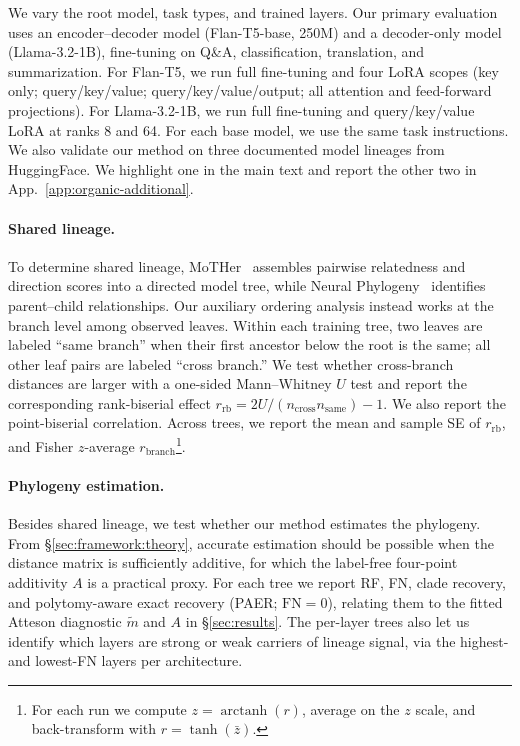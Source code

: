 \documentclass{article}
\theoremstyle{definition}
\theoremstyle{plain}
\begin{document}
We vary the root model, task types, and trained layers. Our primary evaluation uses an
encoder--decoder model (Flan-T5-base, 250M) and a decoder-only model (Llama-3.2-1B), fine-tuning on
Q\&A, classification, translation, and summarization. For Flan-T5, we run full fine-tuning and four LoRA \citep{hu2022lora}
scopes (key only; query/key/value; query/key/value/output; all attention and feed-forward projections).
For Llama-3.2-1B, we run full fine-tuning and query/key/value LoRA at ranks 8 and 64. For each base
model, we use the same task instructions. We also
validate our method on three documented model lineages from HuggingFace. We highlight one in the
main text and report the other two in App.~\ref{app:organic-additional}.

\paragraph{Shared lineage.}
To determine shared lineage, MoTHer~\citep{horwitz2025mother} assembles pairwise relatedness and direction scores into a directed
model tree, while Neural Phylogeny~\citep{yu2025neural} identifies parent--child relationships. Our
auxiliary ordering analysis instead works at the branch level among observed leaves. Within each
training tree, two leaves are labeled ``same branch'' when their first ancestor below the root is
the same; all other leaf pairs are labeled ``cross branch.'' We test whether cross-branch distances
are larger with a one-sided Mann--Whitney $U$ test and report the corresponding rank-biserial effect
$r_{\mathrm{rb}}=2U/(n_{\mathrm{cross}}n_{\mathrm{same}})-1$. We also report the point-biserial correlation. Across trees, we report the mean and
sample SE of $r_{\mathrm{rb}}$, and Fisher $z$-average $r_{\mathrm{branch}}$\footnote{For each run we
compute $z=\operatorname{arctanh}(r)$, average on the $z$ scale, and back-transform with
$r=\tanh(\bar z)$.}.

\paragraph{Phylogeny estimation.}
\label{sec:exp:weights}
Besides shared lineage, we test whether our method estimates the phylogeny. From \S\ref{sec:framework:theory}, accurate estimation should be possible when the distance matrix is sufficiently additive, for which the label-free four-point additivity $A$ is a practical proxy. For each tree we report RF, FN, clade recovery, and polytomy-aware exact recovery (PAER; $\mathrm{FN}=0$), relating them to the fitted Atteson diagnostic $\widetilde m$ and $A$ in \S\ref{sec:results}. The per-layer trees also let us identify which layers are strong or weak carriers of lineage signal, via the highest- and lowest-FN layers per architecture.
\end{document}
